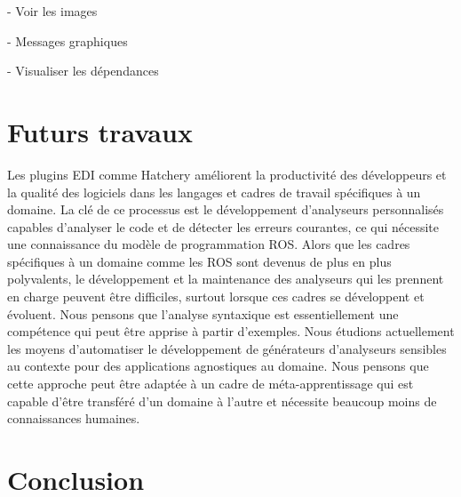 {\begin{multicols}{2}
\begin{todolist}
\begin{todolist}
\item[\done] \href{https://wiki.ros.org/rqt_image_view}{} - Voir les images
\item[\done] \href{https://wiki.ros.org/rqt_graph}{} - Messages graphiques
\item[\done] \href{https://wiki.ros.org/rqt_dep}{} - Visualiser les dépendances
\end{todolist}
\end{todolist}
\end{multicols}

\section{Futurs travaux}

Les plugins EDI comme Hatchery améliorent la productivité des développeurs et la qualité des logiciels dans les langages et cadres de travail spécifiques à un domaine. La clé de ce processus est le développement d'analyseurs personnalisés capables d'analyser le code et de détecter les erreurs courantes, ce qui nécessite une connaissance du modèle de programmation ROS. Alors que les cadres spécifiques à un domaine comme les ROS sont devenus de plus en plus polyvalents, le développement et la maintenance des analyseurs qui les prennent en charge peuvent être difficiles, surtout lorsque ces cadres se développent et évoluent. Nous pensons que l'analyse syntaxique est essentiellement une compétence qui peut être apprise à partir d'exemples. Nous étudions actuellement les moyens d'automatiser le développement de générateurs d'analyseurs sensibles au contexte pour des applications agnostiques au domaine. Nous pensons que cette approche peut être adaptée à un cadre de méta-apprentissage qui est capable d'être transféré d'un domaine à l'autre et nécessite beaucoup moins de connaissances humaines.

\section{Conclusion}

}
